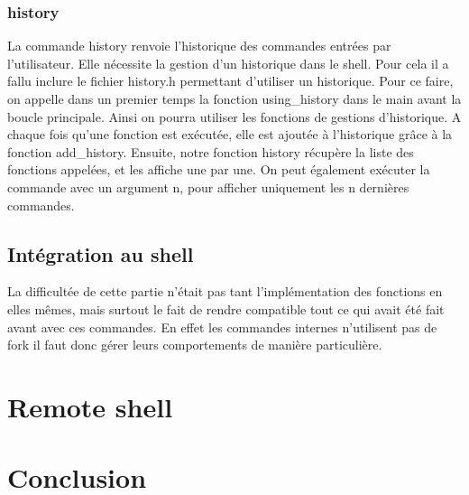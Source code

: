 \documentclass[12pt]{article}
\begin{document}
 \subsubsection{history}
 La commande history renvoie l'historique des commandes entrées par l'utilisateur. 
 Elle nécessite la gestion d'un historique dans le shell. 
 Pour cela il a fallu inclure le fichier history.h permettant d'utiliser un historique. 
 Pour ce faire, on appelle dans un premier temps la fonction using\_history dans le main avant la boucle principale. Ainsi on pourra utiliser les fonctions de gestions d'historique. 
 A chaque fois qu'une fonction est exécutée, elle est ajoutée à l'historique grâce à la fonction add\_history. 
 Ensuite, notre fonction history récupère la liste des fonctions appelées, et les affiche une par une. 
 On peut également exécuter la commande avec un argument n, pour afficher uniquement les n dernières commandes.
 
 \subsection{Intégration au shell}
 
 La difficultée de cette partie n'était pas tant l'implémentation des fonctions en elles mêmes,
 mais surtout le fait de rendre compatible tout ce qui avait été fait avant avec ces commandes.
 En effet les commandes internes n'utilisent pas de fork il faut donc gérer leurs comportements
 de manière particulière.

\newpage
\section{Remote shell}


\newpage
\section{Conclusion}
\end{document}
